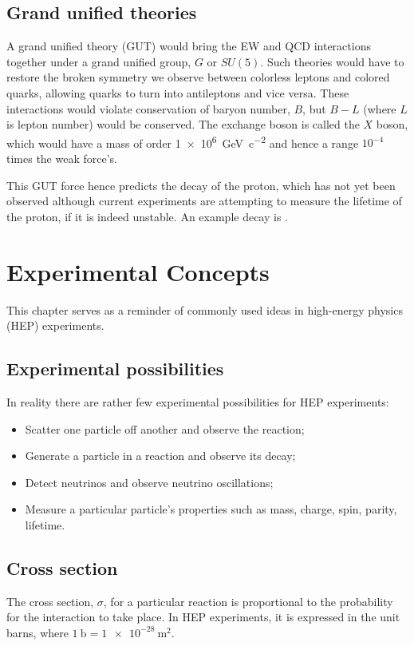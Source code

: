 \documentclass{report}
\begin{document}
\section{Grand unified theories}

A grand unified theory (GUT) would bring the EW and QCD interactions together under a grand unified group, $G$ or $SU(5)$. Such theories would have to restore the broken symmetry we observe between colorless leptons and colored quarks, allowing quarks to turn into antileptons and vice versa. These interactions would violate conservation of baryon number, $B$, but $B-L$ (where $L$ is lepton number) would be conserved. The exchange boson is called the $X$ boson, which would have a mass of order \SI[retain-unity-mantissa = false]{1e6}{\giga\electronvolt\per c^2} and hence a range $10^{-4}$ times the weak force's. 

This GUT force hence predicts the decay of the proton, which has not yet been observed although current experiments are attempting to measure the lifetime of the proton, if it is indeed unstable. An example decay is \HepProcess{\Pproton \to \Ppositron + \Ppizero}.



\chapter{Experimental Concepts}
This chapter serves as a reminder of commonly used ideas in high-energy physics (HEP) experiments.

\section{Experimental possibilities}
In reality there are rather few experimental possibilities for HEP experiments:
\begin{itemize}
\item Scatter one particle off another and observe the reaction;
\item Generate a particle in a reaction and observe its decay;
\item Detect neutrinos and observe neutrino oscillations;
\item Measure a particular particle's properties such as mass, charge, spin, parity, lifetime.
\end{itemize}

\section{Cross section}
The cross section, $\sigma$, for a particular reaction is proportional to the probability for the interaction to take place. In HEP experiments, it is expressed in the unit barns, where $\SI{1}{\barn} = \SI{1e-28}{\meter^2}$.
\end{document}
